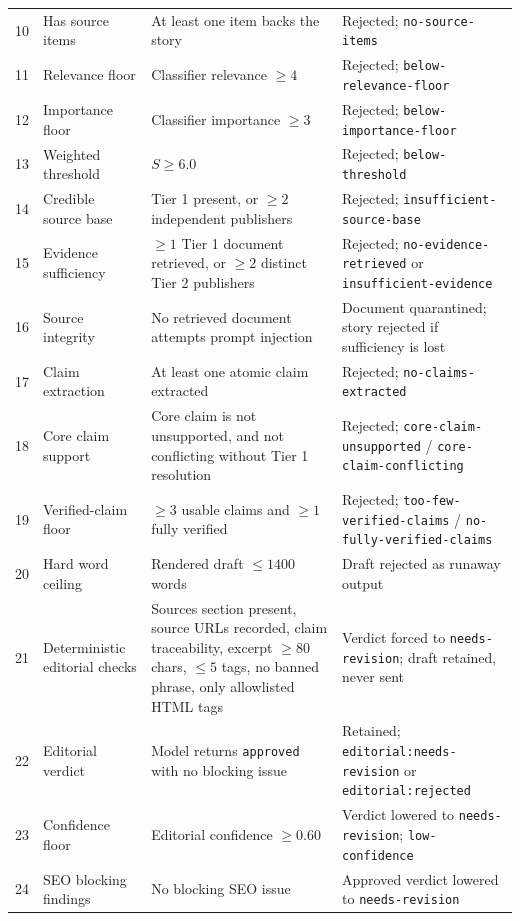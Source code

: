 \documentclass[11pt,a4paper]{article}
\newcommand{\brk}{\hyphenpenalty=0\exhyphenpenalty=0\relax}
\newcommand{\code}[1]{\texttt{\small\brk #1}}
\begin{document}
\begin{center}
\begin{longtable}{@{}c >{\RaggedRight}p{3.9cm} >{\RaggedRight}p{5.0cm} >{\RaggedRight}p{4.3cm}@{}}
10 & Has source items & At least one item backs the story & Rejected; \code{no-source-items} \\
11 & Relevance floor & Classifier relevance $\geq 4$ & Rejected; \code{below-relevance-floor} \\
12 & Importance floor & Classifier importance $\geq 3$ & Rejected; \code{below-importance-floor} \\
13 & Weighted threshold & $S \geq 6.0$ & Rejected; \code{below-threshold} \\
14 & Credible source base & Tier 1 present, or $\geq 2$ independent publishers & Rejected; \code{insufficient-}\allowbreak\code{source-base} \\
15 & Evidence sufficiency & $\geq 1$ Tier 1 document retrieved, or $\geq 2$ distinct Tier 2 publishers & Rejected; \code{no-evidence-retrieved} or \code{insufficient-evidence} \\
16 & Source integrity & No retrieved document attempts prompt injection & Document quarantined; story rejected if sufficiency is lost \\
17 & Claim extraction & At least one atomic claim extracted & Rejected; \code{no-claims-extracted} \\
18 & Core claim support & Core claim is not unsupported, and not conflicting without Tier 1 resolution & Rejected; \code{core-claim-unsupported} / \code{core-claim-conflicting} \\
19 & Verified-claim floor & $\geq 3$ usable claims and $\geq 1$ fully verified & Rejected; \code{too-few-}\allowbreak\code{verified-claims} / \code{no-fully-}\allowbreak\code{verified-claims} \\
20 & Hard word ceiling & Rendered draft $\leq 1400$ words & Draft rejected as runaway output \\
21 & Deterministic editorial checks & Sources section present, source URLs recorded, claim traceability, excerpt $\geq 80$ chars, $\leq 5$ tags, no banned phrase, only allowlisted HTML tags & Verdict forced to \code{needs-revision}; draft retained, never sent \\
22 & Editorial verdict & Model returns \code{approved} with no blocking issue & Retained; \code{editorial:}\allowbreak\code{needs-revision} or \code{editorial:rejected} \\
23 & Confidence floor & Editorial confidence $\geq 0.60$ & Verdict lowered to \code{needs-revision}; \code{low-confidence} \\
24 & SEO blocking findings & No blocking SEO issue & Approved verdict lowered to \code{needs-revision} \\

\end{longtable}
\end{center}
\end{document}
